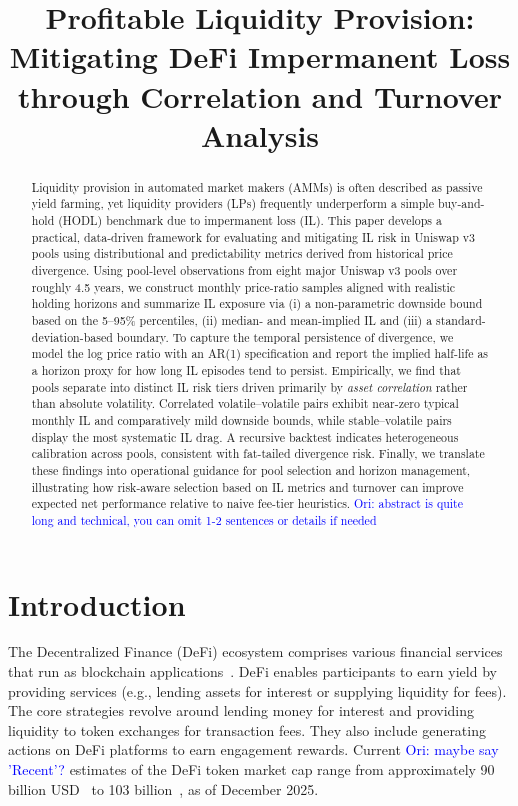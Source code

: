 \documentclass[journal]{IEEEtran}
\title{Profitable Liquidity Provision: Mitigating DeFi Impermanent Loss through Correlation and Turnover Analysis}
\author{}
\newcommand{\ori}[1]{\textcolor{blue}{Ori: #1}}
\begin{document}
\maketitle

\begin{abstract}
Liquidity provision in automated market makers (AMMs) is often described as passive yield farming, yet liquidity providers (LPs) frequently underperform a simple buy-and-hold (HODL) benchmark due to impermanent loss (IL). 
This paper develops a practical, data-driven framework for evaluating and mitigating IL risk in Uniswap v3 pools using distributional and predictability metrics derived from historical price divergence. Using pool-level observations from eight major Uniswap v3 pools over roughly 4.5 years, we construct monthly price-ratio samples aligned with realistic holding horizons and summarize IL exposure via (i) a non-parametric downside bound based on the 5--95\% percentiles, (ii) median- and mean-implied IL and (iii) a standard-deviation-based boundary. To capture the temporal persistence of divergence, we model the log price ratio with an AR(1) specification and report the implied half-life as a horizon proxy for how long IL episodes tend to persist.
Empirically, we find that pools separate into distinct IL risk tiers driven primarily by \emph{asset correlation} rather than absolute volatility. Correlated volatile--volatile pairs exhibit near-zero typical monthly IL and comparatively mild downside bounds, while stable--volatile pairs display the most systematic IL drag. A recursive backtest indicates heterogeneous calibration across pools, consistent with fat-tailed divergence risk. 
Finally, we translate these findings into operational guidance for pool selection and horizon management, illustrating how risk-aware selection based on IL metrics and turnover can improve expected net performance relative to naive fee-tier heuristics. \ori{abstract is quite long and technical, you can omit 1-2 sentences or details if needed}
\end{abstract} 



\pagestyle{plain}
\thispagestyle{empty}

\section{Introduction}

The Decentralized Finance (DeFi) ecosystem comprises various financial services that run as blockchain applications~\cite{schar2021decentralized, zetzsche2020decentralized, jensen2021introduction, Bitcoin, wood2014ethereum}. DeFi enables participants to earn yield by providing services (e.g., lending assets for interest or supplying liquidity for fees). The core strategies revolve around lending money for interest and providing liquidity to token exchanges for transaction fees. They also include generating actions on DeFi platforms to earn engagement rewards. Current \ori{ maybe say 'Recent'?} estimates of the DeFi token market cap range from approximately 90 billion USD~\cite{forbes2025defi} to 103 billion~\cite{coingecko2025defi}, as of December 2025.
\end{document}
